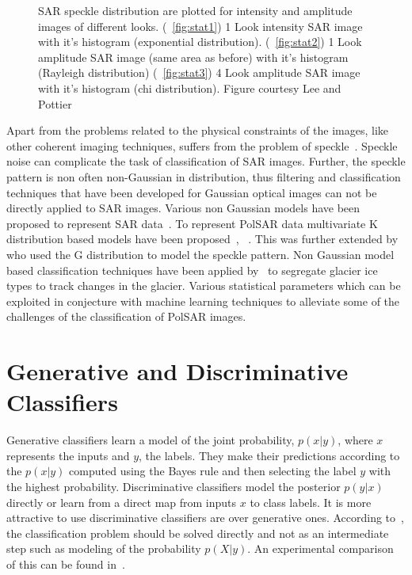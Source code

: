 \begin{figure}
             
\caption[SAR speckle statistics]{ SAR speckle distribution are plotted for intensity and amplitude images of different looks. (~\ref{fig:stat1})  1 Look intensity SAR image with it's histogram (exponential distribution). (~\ref{fig:stat2})  1 Look amplitude SAR image (same area as before) with it's histogram (Rayleigh distribution)   
(~\ref{fig:stat3})  4 Look amplitude SAR image with it's histogram (chi distribution).
Figure courtesy Lee and Pottier~\cite[104]{lee2009polarimetric} }
\end{figure}

Apart from the problems related to the physical constraints of the images, like other coherent imaging techniques, suffers from the problem of speckle~\cite{gagnon1997speckle}. Speckle noise can complicate the task of classification of SAR images. Further, the speckle pattern is non often non-Gaussian in distribution, thus filtering and classification techniques that have been developed for Gaussian optical images can not be directly applied to SAR images. Various non Gaussian models have been proposed to represent SAR data~\cite{jakeman1976model}. To represent PolSAR data multivariate K distribution based models have been proposed~\cite{lee1994k}, ~\cite{doulgeris2010scale}. This was further extended by~\cite{freitas2005polarimetric} who used the G distribution to model the speckle pattern. Non Gaussian model based classification techniques have been applied by~\cite{akbari2010non} to segregate glacier ice types to track changes in the glacier.  Various statistical parameters which can be exploited in conjecture with machine learning techniques to alleviate some of the challenges of the classification of PolSAR images.

\section{Generative and Discriminative Classifiers}
Generative classifiers learn a model of the joint probability, $p(x|y)$, where $x$ represents the inputs and $y$, the labels. They make their predictions according to the $p(x|y)$ computed using the Bayes rule and then selecting the label $y$ with the highest probability. Discriminative classifiers model the posterior $p(y|x)$ directly or learn from a direct map from inputs $x$ to class labels. It is more attractive to use discriminative classifiers are over generative ones. According to~\cite{vapnik1998statistical}, the classification problem should be solved directly and not as an intermediate step such as modeling of the probability $p(X|y)$. An experimental comparison of this can be found in~\cite{ng2002discriminative}.

